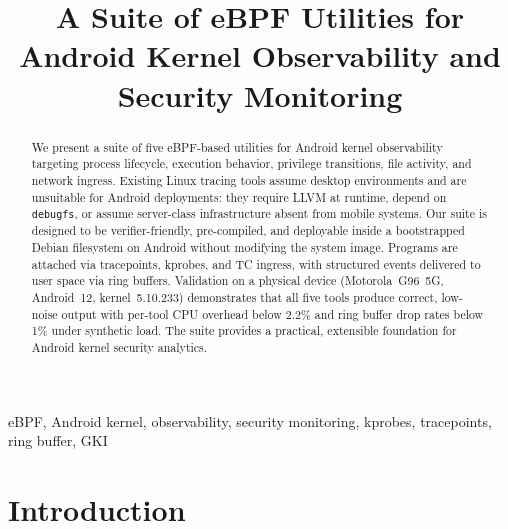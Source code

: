 \documentclass[conference]{IEEEtran}
\begin{document}
\title{A Suite of eBPF Utilities for Android Kernel Observability and Security Monitoring}

\author{
  \and
}

\maketitle

\begin{abstract}
We present a suite of five eBPF-based utilities for Android kernel observability targeting process lifecycle, execution behavior, privilege transitions, file activity, and network ingress. Existing Linux tracing tools assume desktop environments and are unsuitable for Android deployments: they require LLVM at runtime, depend on \texttt{debugfs}, or assume server-class infrastructure absent from mobile systems. Our suite is designed to be verifier-friendly, pre-compiled, and deployable inside a bootstrapped Debian filesystem on Android without modifying the system image. Programs are attached via tracepoints, kprobes, and TC ingress, with structured events delivered to user space via ring buffers. Validation on a physical device (Motorola~G96~5G, Android~12, kernel~5.10.233) demonstrates that all five tools produce correct, low-noise output with per-tool CPU overhead below 2.2\% and ring buffer drop rates below 1\% under synthetic load. The suite provides a practical, extensible foundation for Android kernel security analytics.
\end{abstract}

\begin{IEEEkeywords}
eBPF, Android kernel, observability, security monitoring, kprobes, tracepoints, ring buffer, GKI
\end{IEEEkeywords}

\section{Introduction}
\end{document}
